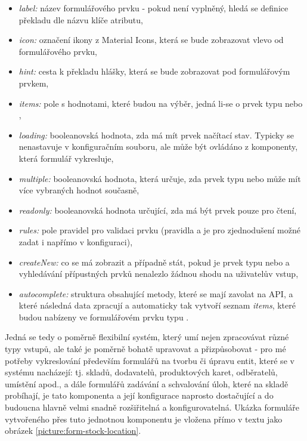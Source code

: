 \begin{itemize}
    \item \emph{label:} název formulářového prvku - pokud není vyplněný, hledá se definice překladu dle názvu klíče atributu,
    \item \emph{icon:} označení ikony z Material Icons, která se bude zobrazovat vlevo od formulářového prvku,
    \item \emph{hint:} cesta k překladu hlášky, která se bude zobrazovat pod formulářovým prvkem,
    \item \emph{items:} pole s hodnotami, které budou na výběr, jedná li-se o prvek typu  nebo ,
    \item \emph{loading:} booleanovská hodnota, zda má mít prvek načítací stav. Typicky se nenastavuje v konfiguračním souboru, ale může být ovládáno z komponenty, která formulář vykresluje,
    \item \emph{multiple:} booleanovská hodnota, která určuje, zda prvek typu  nebo  může mít více vybraných hodnot současně,
    \item \emph{readonly:} booleanovská hodnota určující, zda má být prvek pouze pro čtení,
    \item \emph{rules:} pole pravidel pro validaci prvku (pravidla  a  je pro zjednodušení možné zadat i napřímo v konfiguraci),
    \item \emph{createNew:} co se má zobrazit a případně stát, pokud je prvek typu  nebo  a vyhledávání přípustných prvků nenalezlo žádnou shodu na uživatelův vstup,
    \item \emph{autocomplete:} struktura obsahující metody, které se mají zavolat na API, a které následná data zpracují a automaticky tak vytvoří seznam \emph{items}, které budou nabízeny ve formulářovém prvku typu .
\end{itemize}

Jedná se tedy o poměrně flexibilní systém, který umí nejen zpracovávat různé typy vstupů, ale také je poměrně bohatě upravovat a přizpůsobovat - pro mé potřeby vykreslování především formulářů na tvorbu či úpravu entit, které se v systému nacházejí: tj. skladů, dodavatelů, produktových karet, odběratelů, umístění apod., a dále formulářů zadávání a schvalování úloh, které na skladě probíhají, je tato komponenta a její konfigurace naprosto dostačující a do budoucna hlavně velmi snadně rozšiřitelná a konfigurovatelná. Ukázka formuláře vytvořeného přes tuto jednotnou komponentu je vložena přímo v textu jako obrázek \ref{picture:form-stock-location}.

